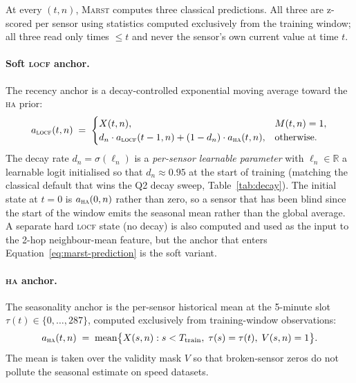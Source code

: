 \documentclass[11pt]{article}
\newcommand{\MARST}{\textsc{Marst}\xspace}
\newcommand{\Real}{\mathbb{R}}
\newcommand{\LOCF}{\textsc{locf}\xspace}
\newcommand{\HA}{\textsc{ha}\xspace}
\begin{document}
At every $(t, n)$, \MARST computes three classical predictions.  All
three are z-scored per sensor using statistics computed exclusively
from the training window; all three read only times $\leq t$ and never
the sensor's own current value at time $t$.

\paragraph{Soft \LOCF anchor.}  The recency anchor is a decay-controlled
exponential moving average toward the \HA prior:
\begin{equation}
a_{\LOCF}(t, n) \;=\;
\begin{cases}
X(t, n), & M(t, n) = 1, \\
d_n \cdot a_{\LOCF}(t-1, n) + (1 - d_n) \cdot a_{\HA}(t, n), & \text{otherwise.}
\end{cases}
\label{eq:soft-locf}
\end{equation}
The decay rate $d_n = \sigma(\ell_n)$ is a \emph{per-sensor learnable
parameter} with $\ell_n \in \Real$ a learnable logit initialised so
that $d_n \approx 0.95$ at the start of training (matching the
classical default that wins the Q2 decay sweep, Table~\ref{tab:decay}).
The initial state at $t = 0$ is $a_{\HA}(0, n)$ rather than zero, so a
sensor that has been blind since the start of the window emits the
seasonal mean rather than the global average.  A separate hard \LOCF
state (no decay) is also computed and used as the input to the 2-hop
neighbour-mean feature, but the anchor that enters
Equation~\ref{eq:marst-prediction} is the soft variant.

\paragraph{\HA anchor.}  The seasonality anchor is the per-sensor
historical mean at the 5-minute slot $\tau(t) \in \{0, \ldots, 287\}$,
computed exclusively from training-window observations:
\begin{equation}
a_{\HA}(t, n) \;=\; \mathrm{mean}\bigl\{ X(s, n) : s < T_{\text{train}},\;
                                                  \tau(s) = \tau(t),\;
                                                  V(s, n) = 1 \bigr\}.
\end{equation}
The mean is taken over the validity mask $V$ so that broken-sensor
zeros do not pollute the seasonal estimate on speed datasets.
\end{document}
